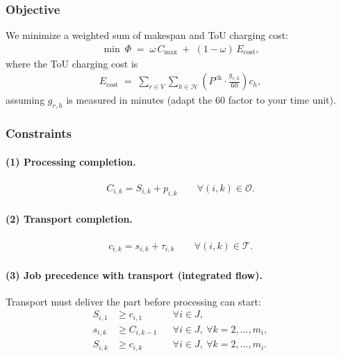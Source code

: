 \documentclass[preprint, 3p, review, 12pt]{elsarticle}
\begin{document}
\subsubsection{Objective}
We minimize a weighted sum of makespan and ToU charging cost:
\begin{align}
\min \ \Phi \;=\; \omega\, C_{\max} \;+\; (1-\omega)\,E_{\mathrm{cost}},
\label{eq:obj}
\end{align}
where the ToU charging cost is
\begin{align}
E_{\mathrm{cost}}
\;=\;
\sum_{r\in V}\sum_{h\in\mathcal{H}}
\left(P^{\mathrm{ch}}\cdot \frac{g_{r,h}}{60}\right)c_h,
\label{eq:cost}
\end{align}
assuming $g_{r,h}$ is measured in minutes (adapt the $60$ factor to your time unit).

\subsubsection{Constraints}

\paragraph{(1) Processing completion.}
\begin{align}
C_{i,k} = S_{i,k} + p_{i,k}
\qquad \forall (i,k)\in\mathcal{O}.
\label{eq:proc_completion}
\end{align}

\paragraph{(2) Transport completion.}
\begin{align}
c_{i,k} = s_{i,k} + \tau_{i,k}
\qquad \forall (i,k)\in\mathcal{T}.
\label{eq:trans_completion}
\end{align}

\paragraph{(3) Job precedence with transport (integrated flow).}
Transport must deliver the part before processing can start:
\begin{align}
S_{i,1} &\ge c_{i,1} && \forall i\in J,
\label{eq:first_op}
\\
s_{i,k} &\ge C_{i,k-1} && \forall i\in J,\ \forall k=2,\dots,m_i,
\label{eq:pickup_after_proc}
\\
S_{i,k} &\ge c_{i,k} && \forall i\in J,\ \forall k=2,\dots,m_i.
\label{eq:proc_after_drop}
\end{align}
\end{document}
